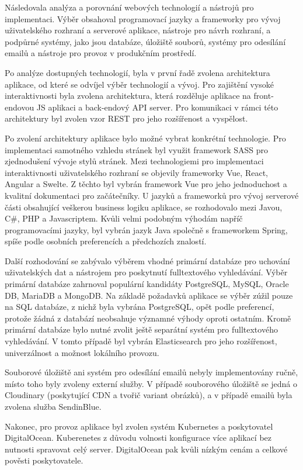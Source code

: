 Následovala analýza a porovnání webových technologií a nástrojů pro implementaci.
Výběr obsahoval programovací jazyky a frameworky pro vývoj uživatelského rozhraní a serverové aplikace, nástroje pro návrh
rozhraní, a podpůrné systémy, jako jsou databáze, úložiště souborů, systémy pro odesílání emailů a nástroje pro provoz
v produkčním prostředí.

Po analýze dostupných technologií, byla v první řadě zvolena architektura aplikace, od které se odvíjel výběr technologií a vývoj.
Pro zajištění vysoké interaktivnosti byla zvolena architektura, která rozděluje aplikace na front-endovou \ac{JS} aplikaci a back-endový
\ac{API} server.
Pro komunikaci v rámci této architektury byl zvolen vzor \ac{REST} pro jeho rozšířenost a vyspělost.

Po zvolení architektury aplikace bylo možné vybrat konkrétní technologie.
Pro implementaci samotného vzhledu stránek byl využit framework \ac{SASS} pro zjednodušení vývoje stylů stránek.
Mezi technologiemi pro implementaci interaktivnosti uživatelského rozhraní se objevily frameworky Vue, React, Angular a Swelte.
Z těchto byl vybrán framework Vue pro jeho jednoduchost a kvalitní dokumentaci pro začátečníky.
U jazyků a frameworků pro vývoj serverové části obsahující veškerou business logiku aplikace, se rozhodovalo mezi Javou,
C\#, PHP a Javascriptem.
Kvůli velmi podobným výhodám napříč programovacími jazyky, byl vybrán jazyk Java společně s frameworkem Spring, spíše podle
osobních preferencích a předchozích znalostí.

Další rozhodování se zabývalo výběrem vhodné primární databáze pro uchování uživatelských dat a nástrojem pro
poskytnutí fulltextového vyhledávání.
Výběr primární databáze zahrnoval populární kandidáty PostgreSQL, MySQL, Oracle DB, MariaDB a MongoDB.
Na základě požadavků aplikace se výběr zúžil pouze na \ac{SQL} databáze, z nichž byla vybrána PostgreSQL,
opět podle preferencí, protože žádná z databází neobsahuje významné výhody oproti ostatním.
Kromě primární databáze bylo nutné zvolit ještě separátní systém pro fulltextového vyhledávání.
V tomto případě byl vybrán Elasticsearch pro jeho rozšířenost, univerzálnost a možnost lokálního provozu.

Souborové úložiště ani systém pro odesílání emailů nebyly implementovány ručně, místo toho byly zvoleny externí služby.
V případě souborového úložiště se jedná o Cloudinary (poskytující \ac{CDN} a tvořič variant obrázků), a v případě
emailů byla zvolena služba SendinBlue.

Nakonec, pro provoz aplikace byl zvolen systém Kubernetes a poskytovatel DigitalOcean.
Kuberenetes z důvodu volnosti konfigurace více aplikací bez nutnosti spravovat celý server.
DigitalOcean pak kvůli nízkým cenám a celkové pověsti poskytovatele.

